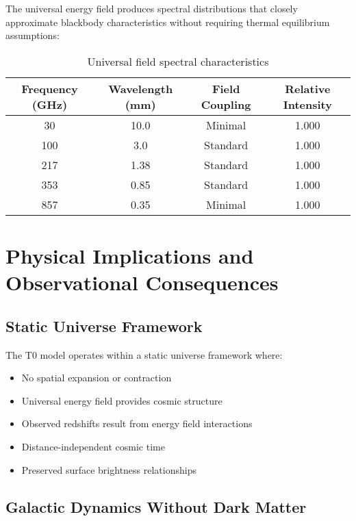 \documentclass[12pt,a4paper]{article}
\begin{document}
	The universal energy field produces spectral distributions that closely approximate blackbody characteristics without requiring thermal equilibrium assumptions:
	
	\begin{table}[htbp]
		\centering
		\begin{tabular}{|c|c|c|c|}
			\hline
			\textbf{Frequency (GHz)} & \textbf{Wavelength (mm)} & \textbf{Field Coupling} & \textbf{Relative Intensity} \\
			\hline
			30 & 10.0 & Minimal & 1.000 \\
			100 & 3.0 & Standard & 1.000 \\
			217 & 1.38 & Standard & 1.000 \\
			353 & 0.85 & Standard & 1.000 \\
			857 & 0.35 & Minimal & 1.000 \\
			\hline
		\end{tabular}
		\caption{Universal field spectral characteristics}
		\label{tab:field_spectrum}
	\end{table}
	
	\section{Physical Implications and Observational Consequences}
	\label{sec:physical_implications}
	
	\subsection{Static Universe Framework}
	\label{subsec:static_framework}
	
	\begin{tcolorbox}[colback=blue!5!white,colframe=blue!75!black,title=Static Universe Paradigm]
		The T0 model operates within a static universe framework where:
		\begin{itemize}
			\item No spatial expansion or contraction
			\item Universal energy field provides cosmic structure
			\item Observed redshifts result from energy field interactions
			\item Distance-independent cosmic time
			\item Preserved surface brightness relationships
		\end{itemize}
	\end{tcolorbox}
	
	\subsection{Galactic Dynamics Without Dark Matter}
	\label{subsec:galactic_dynamics}
	
\end{document}

